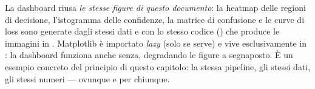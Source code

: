 La dashboard riusa \emph{le stesse figure di questo documento}: la heatmap
delle regioni di decisione, l'istogramma delle confidenze, la matrice di
confusione e le curve di loss sono generate dagli stessi dati e con lo
stesso codice () che produce le immagini in
. Matplotlib è importato \emph{lazy} (solo se
serve) e vive esclusivamente in : la dashboard funziona anche
senza, degradando le figure a segnaposto. È un esempio concreto del
principio di questo capitolo: la stessa pipeline, gli stessi dati, gli
stessi numeri — ovunque e per chiunque.